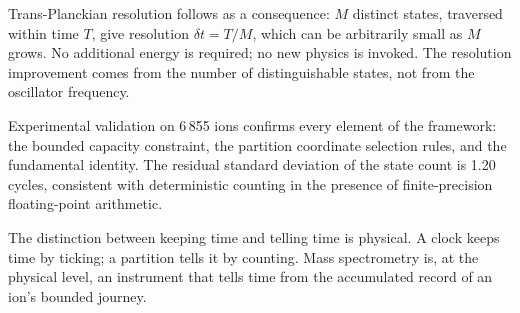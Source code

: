 \documentclass[twocolumn,10pt]{article}
\begin{document}
Trans-Planckian resolution follows as a consequence: $M$ distinct states, traversed within time $T$, give resolution $\delta t = T/M$, which can be arbitrarily small as $M$ grows. No additional energy is required; no new physics is invoked. The resolution improvement comes from the number of distinguishable states, not from the oscillator frequency.

Experimental validation on 6\,855 ions confirms every element of the framework: the bounded capacity constraint, the partition coordinate selection rules, and the fundamental identity. The residual standard deviation of the state count is 1.20 cycles, consistent with deterministic counting in the presence of finite-precision floating-point arithmetic.

The distinction between keeping time and telling time is physical. A clock keeps time by ticking; a partition tells it by counting. Mass spectrometry is, at the physical level, an instrument that tells time from the accumulated record of an ion's bounded journey.



\end{document}
